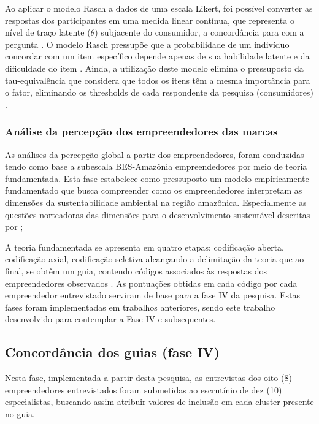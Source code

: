 Ao aplicar o modelo Rasch a dados de uma escala Likert, foi possível converter as respostas dos participantes em uma medida linear contínua, que representa o nível de traço latente ($\theta$) subjacente do consumidor, a concordância para com a pergunta \cite{Wright1982RatingAnalysis}. O modelo Rasch pressupõe que a probabilidade de um indivíduo concordar com um item específico depende apenas de sua habilidade latente e da dificuldade do item \cite{Bond2015ApplyingSciences}. Ainda, a utilização deste modelo elimina o pressuposto da tau-equivalência que considera que todos os itens têm a mesma importância para o fator, eliminando os thresholds de cada respondente da pesquisa (consumidores) \cite{Sijtsma2008OnAlpha,Yuan2015}.




\subsubsection{Análise da percepção dos empreendedores das marcas}

As análises da percepção global a partir dos empreendedores, foram conduzidas tendo como base a subescala BES-Amazônia empreendedores por meio de teoria fundamentada. Esta fase estabelece como pressuposto um modelo empiricamente fundamentado que busca compreender como os empreendedores interpretam as dimensões da sustentabilidade ambiental na região amazônica. Especialmente as questões norteadoras das dimensões para o desenvolvimento sustentável descritas por ;

A teoria fundamentada se apresenta em quatro etapas: codificação aberta, codificação axial, codificação seletiva alcançando a delimitação da teoria que ao final, se obtêm um guia, contendo códigos associados às respostas dos empreendedores observados \cite{Glaser2017DiscoveryResearchb,Mills2006TheTheory}. As pontuações obtidas em cada código por cada empreendedor entrevistado serviram de base para a fase IV da pesquisa. Estas fases foram implementadas em trabalhos anteriores, sendo este trabalho desenvolvido para contemplar a Fase IV e subsequentes.


\subsection{Concordância dos guias (fase IV)}


Nesta fase, implementada a partir desta pesquisa, as entrevistas dos oito (8) empreendedores entrevistados foram submetidas ao escrutínio de dez (10) especialistas, buscando assim atribuir valores de inclusão em cada cluster presente no guia. 

